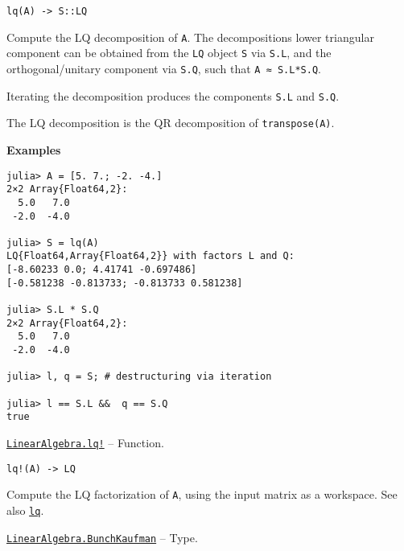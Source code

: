 \begin{adjustwidth}{2em}{0pt}


\begin{verbatim}
lq(A) -> S::LQ
\end{verbatim}

Compute the LQ decomposition of \texttt{A}. The decomposition{\textquotesingle}s lower triangular component can be obtained from the \texttt{LQ} object \texttt{S} via \texttt{S.L}, and the orthogonal/unitary component via \texttt{S.Q}, such that \texttt{A ≈ S.L*S.Q}.

Iterating the decomposition produces the components \texttt{S.L} and \texttt{S.Q}.

The LQ decomposition is the QR decomposition of \texttt{transpose(A)}.

\textbf{Examples}


\begin{verbatim}
julia> A = [5. 7.; -2. -4.]
2×2 Array{Float64,2}:
  5.0   7.0
 -2.0  -4.0

julia> S = lq(A)
LQ{Float64,Array{Float64,2}} with factors L and Q:
[-8.60233 0.0; 4.41741 -0.697486]
[-0.581238 -0.813733; -0.813733 0.581238]

julia> S.L * S.Q
2×2 Array{Float64,2}:
  5.0   7.0
 -2.0  -4.0

julia> l, q = S; # destructuring via iteration

julia> l == S.L &&  q == S.Q
true
\end{verbatim}



\end{adjustwidth}
\hypertarget{11794326565026371502}{} 
\hyperlink{11794326565026371502}{\texttt{LinearAlgebra.lq!}}  -- {Function.}

\begin{adjustwidth}{2em}{0pt}


\begin{verbatim}
lq!(A) -> LQ
\end{verbatim}

Compute the LQ factorization of \texttt{A}, using the input matrix as a workspace. See also \hyperlink{1096124289761034610}{\texttt{lq}}.



\end{adjustwidth}
\hypertarget{10272627787201613275}{} 
\hyperlink{10272627787201613275}{\texttt{LinearAlgebra.BunchKaufman}}  -- {Type.}

